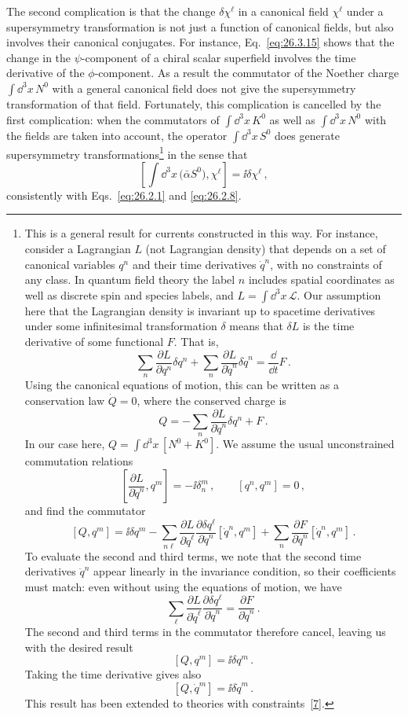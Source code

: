 The second complication is that the change \(\delta\chi^\ell\) in a canonical
field \(\chi^\ell\) under a supersymmetry transformation is not just a
function of canonical fields, but also involves their canonical conjugates.
For instance, Eq.~\eqref{eq:26.3.15} shows that the change in the
\(\psi\)-component of a chiral scalar superfield involves the time derivative
of the \(\phi\)-component. As a result the commutator of the Noether charge
\(\int \dd^3x\,N^0\) with a general canonical field does not give the
supersymmetry transformation of that field. Fortunately, this complication
is cancelled by the first complication: when the commutators of
\(\int \dd^3x\,K^0\) as well as \(\int \dd^3x\,N^0\) with the fields are taken
into account, the operator \(\int \dd^3x\,S^0\) does generate supersymmetry
transformations\footnote{This is a general result for currents constructed in
this way. For instance, consider a Lagrangian \(L\) (not Lagrangian density)
that depends on a set of canonical variables \(q^n\) and their time
derivatives \(\dot q^n\), with no constraints of any class. In quantum field
theory the label \(n\) includes spatial coordinates as well as discrete spin
and species labels, and \(L=\int \dd^3x\,\mathcal{L}\). Our assumption here
that the Lagrangian density is invariant up to spacetime derivatives under
some infinitesimal transformation \(\delta\) means that \(\delta L\) is the
time derivative of some functional \(F\). That is,
\[
  \sum_n\frac{\partial L}{\partial q^n}\delta q^n
  +\sum_n\frac{\partial L}{\partial\dot q^n}\delta\dot q^n
  =\frac{\dd}{\dd t}F\,.
\]
Using the canonical equations of motion, this can be written as a
conservation law \(\dot Q=0\), where the conserved charge is
\[
  Q=-\sum_n\frac{\partial L}{\partial\dot q^n}\delta q^n+F\,.
\]
In our case here, \(Q=\int \dd^3x\,[N^0+K^0]\). We assume the usual
unconstrained commutation relations
\[
  \left[\frac{\partial L}{\partial\dot q^n},q^m\right]
  =-\ii\delta_n^m\,,
  \qquad
  [q^n,q^m]=0\,,
\]
and find the commutator
\[
  [Q,q^m]
  =\ii\delta q^m
  -\sum_{n\ell}
   \frac{\partial L}{\partial\dot q^\ell}
   \frac{\partial\delta q^\ell}{\partial\dot q^n}
   [\dot q^n,q^m]
  +\sum_n
   \frac{\partial F}{\partial\dot q^n}
   [\dot q^n,q^m]\,.
\]
To evaluate the second and third terms, we note that the second time
derivatives \(\ddot q^n\) appear linearly in the invariance condition, so
their coefficients must match: even without using the equations of motion,
we have
\[
  \sum_\ell
  \frac{\partial L}{\partial\dot q^\ell}
  \frac{\partial\delta q^\ell}{\partial\dot q^n}
  =\frac{\partial F}{\partial\dot q^n}\,.
\]
The second and third terms in the commutator therefore cancel, leaving us
with the desired result
\[
  [Q,q^m]=\ii\delta q^m\,.
\]
Taking the time derivative gives also
\[
  [Q,\dot q^m]=\ii\delta\dot q^m\,.
\]
This result has been extended to theories with
constraints~\hyperref[ch26-ref-7]{[7]}.} in the sense that
\begin{equation}
  \left[
    \int \dd^3x\,\bigl(\bar\alpha S^0\bigr),\chi^\ell
  \right]
  =\ii\delta\chi^\ell\,,
  \tag{26.7.6}\label{eq:26.7.6}
\end{equation}
consistently with Eqs.~\eqref{eq:26.2.1} and \eqref{eq:26.2.8}.

